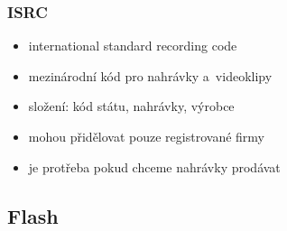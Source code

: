 \documentclass[a4paper,12pt]{article}
\providecommand{\tightlist}{%
\setlength{\itemsep}{0pt}\setlength{\parskip}{0pt}}
\begin{document}
\subsubsection{ISRC}

\begin{itemize}
  \tightlist
  \item international standard recording code
  \item mezinárodní kód pro nahrávky a~videoklipy
  \item složení: kód státu, nahrávky, výrobce
  \item mohou přidělovat pouze registrované firmy
  \item je protřeba pokud chceme nahrávky prodávat
\end{itemize}

\subsection{Flash}
\end{document}
